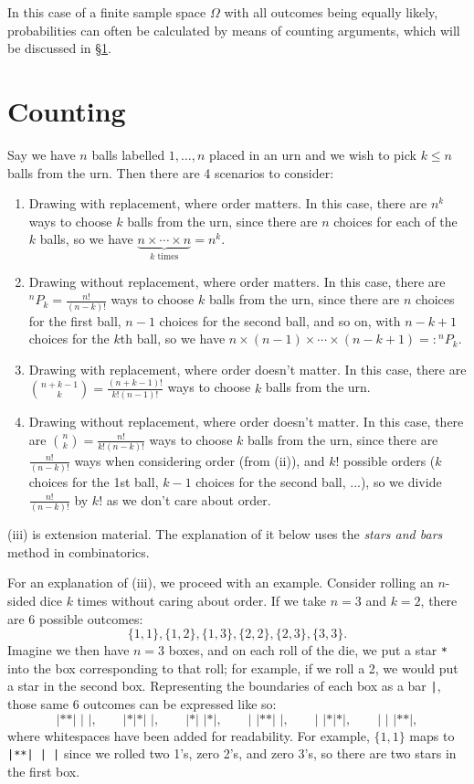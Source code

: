 In this case of a finite sample space $\Omega$ with all outcomes being equally likely, probabilities can often be calculated by means of counting arguments, which will be discussed in \S\ref{counting}.

\section{Counting}\label{counting}

Say we have $n$ balls labelled $1, \dots, n$ placed in an urn and we wish to pick $k \leq n$ balls from the urn. Then there are 4 scenarios to consider:
\begin{enumerate}[label=(\roman*)]
    \item Drawing with replacement, where order matters. In this case, there are $n^k$ ways to choose $k$ balls from the urn, since there are $n$ choices for each of the $k$ balls, so we have $\underbrace{n \times \cdots \times n}_{\text{$k$ times}} = n^k$.
    \item Drawing without replacement, where order matters. In this case, there are $^nP_k = \frac{n!}{(n-k)!}$ ways to choose $k$ balls from the urn, since there are $n$ choices for the first ball, $n-1$ choices for the second ball, and so on, with $n-k+1$ choices for the $k$th ball, so we have $n \times (n - 1) \times \cdots \times (n - k + 1) =: {^nP_k}$.
    \item Drawing with replacement, where order doesn't matter. In this case, there are $\binom{n+k-1}{k} = \frac{(n+k-1)!}{k!(n-1)!}$ ways to choose $k$ balls from the urn.
    \item Drawing without replacement, where order doesn't matter. In this case, there are $\binom{n}{k} = \frac{n!}{k!(n-k)!}$ ways to choose $k$ balls from the urn, since there are $\frac{n!}{(n-k)!}$ ways when considering order (from (ii)), and $k!$ possible orders ($k$ choices for the 1st ball, $k-1$ choices for the second ball, ...), so we divide $\frac{n!}{(n-k)!}$ by $k!$ as we don't care about order.
\end{enumerate}

\begin{remark}
    (iii) is extension material. The explanation of it below uses the \emph{stars and bars} method in combinatorics.
\end{remark}

For an explanation of (iii), we proceed with an example. Consider rolling an $n$-sided dice $k$ times without caring about order. If we take $n = 3$ and $k = 2$, there are 6 possible outcomes:
\[
    \{1, 1\}, \{1, 2\}, \{1, 3\}, \{2, 2\}, \{2, 3\}, \{3, 3\}
.\]
Imagine we then have $n = 3$ boxes, and on each roll of the die, we put a star \texttt{*} into the box corresponding to that roll; for example, if we roll a 2, we would put a star in the second box. Representing the boundaries of each box as a bar \texttt{|}, those same 6 outcomes can be expressed like so:
\[
    \texttt{|**| | |}, \qquad \texttt{|*|*| |}, \qquad \texttt{|*| |*|}, \qquad \texttt{| |**| |}, \qquad \texttt{| |*|*|}, \qquad \texttt{| | |**|}
,\]
where whitespaces have been added for readability. For example, $\{1, 1\}$ maps to \texttt{|**| | |} since we rolled two 1's, zero 2's, and zero 3's, so there are two stars in the first box.

